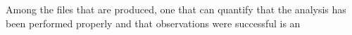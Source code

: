 \documentclass[a4paper,12pt]{article}
\begin{document}
                                                                                                                                                                                                                                                                                                                                                                                                                                                                                                                                                                                                                                                                                                                                                                                                                                                                                                                                                                                                                                                                                                                                                                                                                                                                                                                                                                                                                                                                                                                                                                                                                                                                                                                                                                                                                                                                                                                                                                                                                                                                                                                                                                                                                                                                                                                                                                                                                                                                                                                                                                                                                                                                                                                                                                                                                                                                                                                                                                                                                                                                                                                                                                                                                                                                                                                 Among the files that are produced, one that can quantify that the analysis has been performed properly and that observations were successful is an 
\end{document}
